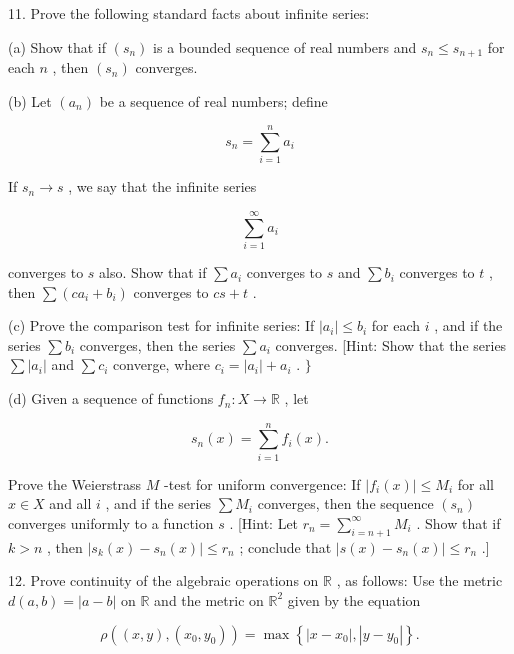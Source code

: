 11. Prove the following standard facts about infinite series:

(a) Show that if \(\left( {s}_{n}\right)\) is a bounded sequence of real numbers and \({s}_{n} \leq  {s}_{n + 1}\) for each \(n\) , then \(\left( {s}_{n}\right)\) converges.

(b) Let \(\left( {a}_{n}\right)\) be a sequence of real numbers; define

\[
{s}_{n} = \mathop{\sum }\limits_{{i = 1}}^{n}{a}_{i}
\]

If \({s}_{n} \rightarrow  s\) , we say that the infinite series

\[
\mathop{\sum }\limits_{{i = 1}}^{\infty }{a}_{i}
\]

converges to \(s\) also. Show that if \(\sum {a}_{i}\) converges to \(s\) and \(\sum {b}_{i}\) converges to \(t\) , then \(\sum \left( {c{a}_{i} + {b}_{i}}\right)\) converges to \({cs} + t\) .

(c) Prove the comparison test for infinite series: If \(\left| {a}_{i}\right|  \leq  {b}_{i}\) for each \(i\) , and if the series \(\sum {b}_{i}\) converges, then the series \(\sum {a}_{i}\) converges. [Hint: Show that the series \(\sum \left| {a}_{i}\right|\) and \(\sum {c}_{i}\) converge, where \({c}_{i} = \left| {a}_{i}\right|  + {a}_{i}\) . \(\}\)

(d) Given a sequence of functions \({f}_{n} : X \rightarrow  \mathbb{R}\) , let

\[
{s}_{n}\left( x\right)  = \mathop{\sum }\limits_{{i = 1}}^{n}{f}_{i}\left( x\right) .
\]

Prove the Weierstrass \(M\) -test for uniform convergence: If \(\left| {{f}_{i}\left( x\right) }\right|  \leq  {M}_{i}\) for all \(x \in  X\) and all \(i\) , and if the series \(\sum {M}_{i}\) converges, then the sequence \(\left( {s}_{n}\right)\) converges uniformly to a function \(s\) . [Hint: Let \({r}_{n} = \mathop{\sum }\limits_{{i = n + 1}}^{\infty }{M}_{i}\) . Show that if \(k > n\) , then \(\left| {{s}_{k}\left( x\right)  - {s}_{n}\left( x\right) }\right|  \leq  {r}_{n}\) ; conclude that \(\left| {s\left( x\right)  - {s}_{n}\left( x\right) }\right|  \leq  {r}_{n}\) .]

12. Prove continuity of the algebraic operations on \(\mathbb{R}\) , as follows: Use the metric \(d\left( {a,b}\right)  = \left| {a - b}\right|\) on \(\mathbb{R}\) and the metric on \({\mathbb{R}}^{2}\) given by the equation

\[
\rho \left( {\left( {x,y}\right) ,\left( {{x}_{0},{y}_{0}}\right) }\right)  = \max \left\{  {\left| {x - {x}_{0}}\right| ,\left| {y - {y}_{0}}\right| }\right\}  .
\]

